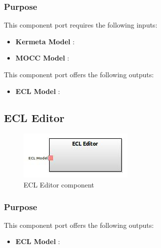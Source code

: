 \documentclass{gemoc} %
\begin{document}
\subsubsection{Purpose}

This component port requires the following inputs:
\begin{itemize}
  \item \textbf{Kermeta Model} :
  \item \textbf{MOCC Model} :
\end{itemize}

This component port offers the following outputs:
\begin{itemize}
  \item \textbf{ECL Model} :
\end{itemize}

\subsection{ECL Editor}

\begin{figure}[htp]
	\begin{center}
	\includegraphics*[trim=0.0cm 0.0cm 0cm 0.0cm, clip=true, scale=1.0]{../images/generated/Generated_ECL Editor.jpg}
	\caption{ECL Editor component}
	\label{fig:ECL Editor}
	\end{center}
\end{figure}

\subsubsection{Purpose}


This component port offers the following outputs:
\begin{itemize}
  \item \textbf{ECL Model} :
\end{itemize}
\end{document}
